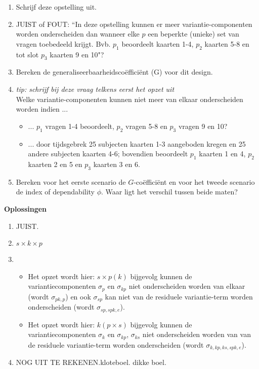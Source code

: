 {\begin{enumerate}
\begin{enumerate}
	\item Schrijf deze opstelling uit.
	\item JUIST of FOUT: ``In deze opstelling kunnen er meer variantie-componenten worden onderscheiden dan wanneer elke $p$ een beperkte (unieke) set van vragen toebedeeld krijgt. Bvb. $p_1$ beoordeelt kaarten 1-4, $p_2$ kaarten 5-8 en tot slot $p_3$ kaarten 9 en 10"?
	\item Bereken de generaliseerbaarheidsco\"{e}ffici\"{e}nt (G) voor dit design.
	\item \emph{tip: schrijf bij deze vraag telkens eerst het opzet uit}\\
	Welke variantie-componenten kunnen niet meer van elkaar onderscheiden worden indien ... 
\begin{itemize}
	\item ... $p_1$ vragen 1-4 beoordeelt, $p_2$ vragen 5-8 en $p_3$ vragen 9 en 10?
	\item ... door tijdsgebrek 25 subjecten kaarten 1-3 aangeboden kregen en 25 andere subjecten kaarten 4-6; bovendien beoordeelt $p_1$ kaarten 1 en 4, $p_2$ kaarten 2 en 5 en $p_3$ kaarten 3 en 6.
\end{itemize}
\item Bereken voor het eerste scenario de $G$-co\"{e}ffici\"{e}nt en voor het tweede scenario de index of dependability $\phi$. Waar ligt het verschil tussen beide maten?
\end{enumerate}
\end{enumerate}
}

\OPLOSSING
{
\textbf{Oplossingen}
\begin{enumerate}
\item JUIST.
\item $s \times k \times p$
\item 
\begin{itemize}
	\item Het opzet wordt hier: $s\times p\left(k\right)$ bijgevolg kunnen de variantiecomponenten $\sigma_p$ en $\sigma_{kp}$ niet onderscheiden worden van elkaar (wordt $\sigma_{pk,p}$) en ook $\sigma_{sp}$ kan niet van de residuele variantie-term worden onderscheiden (wordt $\sigma_{sp, spk,e}$).
	\item Het opzet wordt hier: $k\left(p\times s\right)$ bijgevolg kunnen de variantiecomponenten $\sigma_k$ en $\sigma_{kp}$, $\sigma_{ks}$ niet onderscheiden worden van  van de residuele variantie-term worden onderscheiden (wordt $\sigma_{k, kp, ks, spk, e}$).  
\end{itemize}
\item NOG UIT TE REKENEN.kloteboel. dikke boel.
\end{enumerate} 
}

